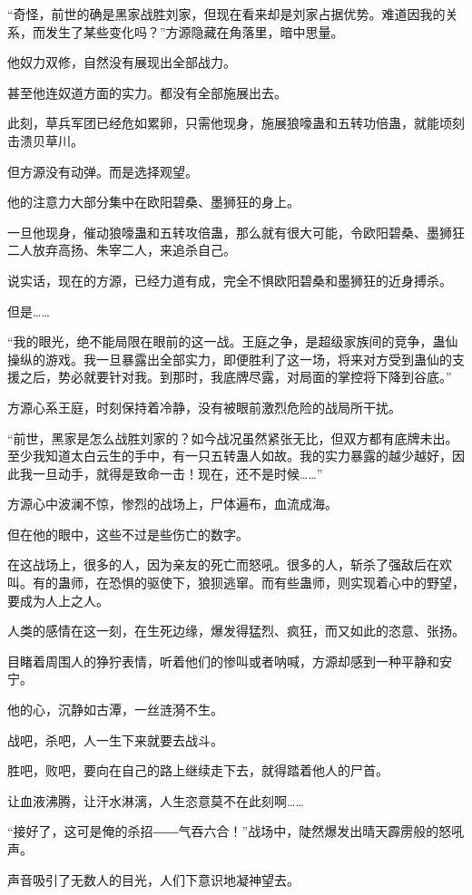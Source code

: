 \begin{this_body}
“奇怪，前世的确是黑家战胜刘家，但现在看来却是刘家占据优势。难道因我的关系，而发生了某些变化吗？”方源隐藏在角落里，暗中思量。

他奴力双修，自然没有展现出全部战力。

甚至他连奴道方面的实力。都没有全部施展出去。

此刻，草兵军团已经危如累卵，只需他现身，施展狼嚎蛊和五转功倍蛊，就能顷刻击溃贝草川。

但方源没有动弹。而是选择观望。

他的注意力大部分集中在欧阳碧桑、墨狮狂的身上。

一旦他现身，催动狼嚎蛊和五转攻倍蛊，那么就有很大可能，令欧阳碧桑、墨狮狂二人放弃高扬、朱宰二人，来追杀自己。

说实话，现在的方源，已经力道有成，完全不惧欧阳碧桑和墨狮狂的近身搏杀。

但是……

“我的眼光，绝不能局限在眼前的这一战。王庭之争，是超级家族间的竞争，蛊仙操纵的游戏。我一旦暴露出全部实力，即便胜利了这一场，将来对方受到蛊仙的支援之后，势必就要针对我。到那时，我底牌尽露，对局面的掌控将下降到谷底。”

方源心系王庭，时刻保持着冷静，没有被眼前激烈危险的战局所干扰。

“前世，黑家是怎么战胜刘家的？如今战况虽然紧张无比，但双方都有底牌未出。至少我知道太白云生的手中，有一只五转蛊人如故。我的实力暴露的越少越好，因此我一旦动手，就得是致命一击！现在，还不是时候……”

方源心中波澜不惊，惨烈的战场上，尸体遍布，血流成海。

但在他的眼中，这些不过是些伤亡的数字。

在这战场上，很多的人，因为亲友的死亡而怒吼。很多的人，斩杀了强敌后在欢叫。有的蛊师，在恐惧的驱使下，狼狈逃窜。而有些蛊师，则实现着心中的野望，要成为人上之人。

人类的感情在这一刻，在生死边缘，爆发得猛烈、疯狂，而又如此的恣意、张扬。

目睹着周围人的狰狞表情，听着他们的惨叫或者呐喊，方源却感到一种平静和安宁。

他的心，沉静如古潭，一丝涟漪不生。

战吧，杀吧，人一生下来就要去战斗。

胜吧，败吧，要向在自己的路上继续走下去，就得踏着他人的尸首。

让血液沸腾，让汗水淋漓，人生恣意莫不在此刻啊……

“接好了，这可是俺的杀招――气吞六合！”战场中，陡然爆发出晴天霹雳般的怒吼声。

声音吸引了无数人的目光，人们下意识地凝神望去。


\end{this_body}
